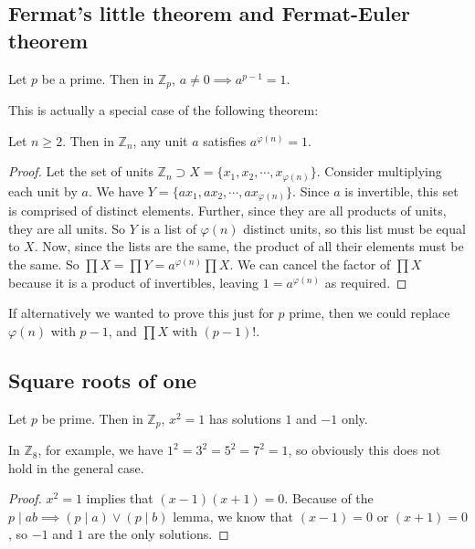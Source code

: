 \subsection{Fermat's little theorem and Fermat-Euler theorem}
\begin{theorem}
	Let \(p\) be a prime.
	Then in \(\mathbb Z_p\), \(a \neq 0 \implies a^{p-1} = 1\).
\end{theorem}
\noindent This is actually a special case of the following theorem:
\begin{theorem}
	Let \(n \geq 2\).
	Then in \(\mathbb Z_n\), any unit \(a\) satisfies \(a^{\varphi(n)} = 1\).
\end{theorem}
\begin{proof}
	Let the set of units \(\mathbb Z_n \supset X = \{ x_1, x_2, \cdots, x_{\varphi(n)} \}\).
	Consider multiplying each unit by \(a\).
	We have \(Y = \{ ax_1, ax_2, \cdots, ax_{\varphi(n)} \}\).
	Since \(a\) is invertible, this set is comprised of distinct elements.
	Further, since they are all products of units, they are all units.
	So \(Y\) is a list of \(\varphi(n)\) distinct units, so this list must be equal to \(X\).
	Now, since the lists are the same, the product of all their elements must be the same.
	So \(\prod X = \prod Y = a^{\varphi(n)}\prod X\).
	We can cancel the factor of \(\prod X\) because it is a product of invertibles, leaving \(1 = a^{\varphi(n)}\) as required.
\end{proof}
If alternatively we wanted to prove this just for \(p\) prime, then we could replace \(\varphi(n)\) with \(p-1\), and \(\prod X\) with \((p-1)!
\).

\subsection{Square roots of one}
\begin{lemma}
	Let \(p\) be prime.
	Then in \(\mathbb Z_p\), \(x^2 = 1\) has solutions \(1\) and \(-1\) only.
\end{lemma}
\begin{note}
	In \(\mathbb Z_8\), for example, we have \(1^2 = 3^2 = 5^2 = 7^2 = 1\), so obviously this does not hold in the general case.
\end{note}
\begin{proof}
	\(x^2 = 1\) implies that \((x-1)(x+1) = 0\).
	Because of the \(p\mid ab\implies (p\mid a) \lor (p\mid b)\) lemma, we know that \((x-1) = 0\) or \((x+1) = 0\), so \(-1\) and \(1\) are the only solutions.
\end{proof}

